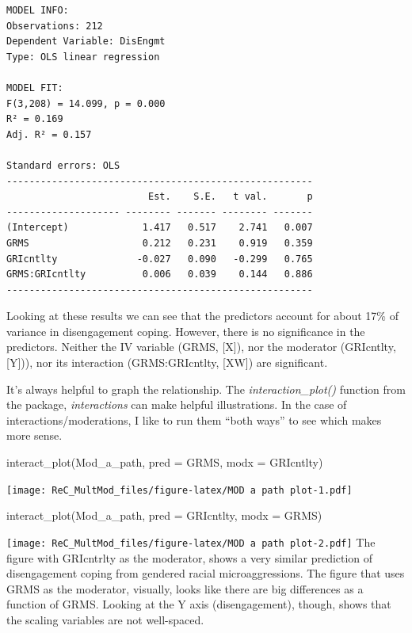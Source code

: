 \documentclass[
]{book}
\newenvironment{Shaded}{\begin{snugshade}}{\end{snugshade}}
\newcommand{\AttributeTok}[1]{\textcolor[rgb]{0.77,0.63,0.00}{#1}}
\newcommand{\FunctionTok}[1]{\textcolor[rgb]{0.00,0.00,0.00}{#1}}
\newcommand{\NormalTok}[1]{#1}
\begin{document}
\begin{verbatim}
MODEL INFO:
Observations: 212
Dependent Variable: DisEngmt
Type: OLS linear regression 

MODEL FIT:
F(3,208) = 14.099, p = 0.000
R² = 0.169
Adj. R² = 0.157 

Standard errors: OLS
------------------------------------------------------
                         Est.    S.E.   t val.       p
-------------------- -------- ------- -------- -------
(Intercept)             1.417   0.517    2.741   0.007
GRMS                    0.212   0.231    0.919   0.359
GRIcntlty              -0.027   0.090   -0.299   0.765
GRMS:GRIcntlty          0.006   0.039    0.144   0.886
------------------------------------------------------
\end{verbatim}

Looking at these results we can see that the predictors account for about 17\% of variance in disengagement coping. However, there is no significance in the predictors. Neither the IV variable (GRMS, {[}X{]}), nor the moderator (GRIcntlty, {[}Y{]})), nor its interaction (GRMS:GRIcntlty, {[}XW{]}) are significant.

It's always helpful to graph the relationship. The \emph{interaction\_plot()} function from the package, \emph{interactions} can make helpful illustrations. In the case of interactions/moderations, I like to run them ``both ways'' to see which makes more sense.

\begin{Shaded}
\begin{Highlighting}[]
\FunctionTok{interact\_plot}\NormalTok{(Mod\_a\_path, }\AttributeTok{pred =}\NormalTok{ GRMS, }\AttributeTok{modx =}\NormalTok{ GRIcntlty)}
\end{Highlighting}
\end{Shaded}

\texttt{[image: ReC\_MultMod\_files/figure-latex/MOD a path plot-1.pdf]}

\begin{Shaded}
\begin{Highlighting}[]
\FunctionTok{interact\_plot}\NormalTok{(Mod\_a\_path, }\AttributeTok{pred =}\NormalTok{ GRIcntlty, }\AttributeTok{modx =}\NormalTok{ GRMS)}
\end{Highlighting}
\end{Shaded}

\texttt{[image: ReC\_MultMod\_files/figure-latex/MOD a path plot-2.pdf]}
The figure with GRIcntrlty as the moderator, shows a very similar prediction of disengagement coping from gendered racial microaggressions. The figure that uses GRMS as the moderator, visually, looks like there are big differences as a function of GRMS. Looking at the Y axis (disengagement), though, shows that the scaling variables are not well-spaced.
\end{document}
